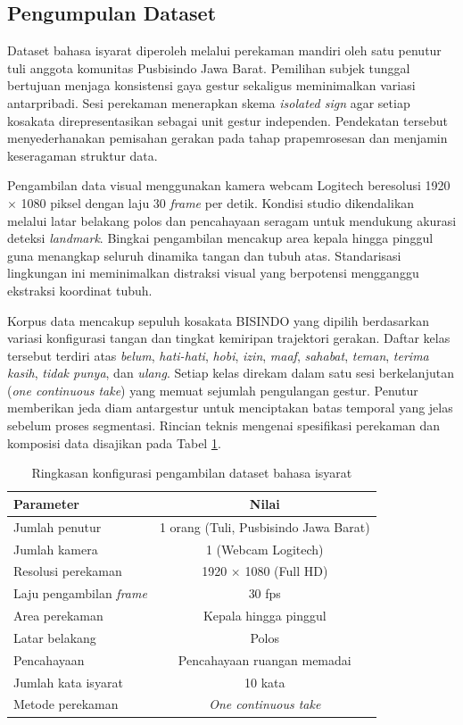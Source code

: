 \subsection{Pengumpulan Dataset}
\label{subsec:pengumpulan-dataset}
Dataset bahasa isyarat diperoleh melalui perekaman mandiri oleh satu penutur tuli anggota komunitas Pusbisindo Jawa Barat. 
Pemilihan subjek tunggal bertujuan menjaga konsistensi gaya gestur sekaligus meminimalkan variasi antarpribadi. 
Sesi perekaman menerapkan skema \textit{isolated sign} agar setiap kosakata direpresentasikan sebagai unit gestur independen. 
Pendekatan tersebut menyederhanakan pemisahan gerakan pada tahap prapemrosesan dan menjamin keseragaman struktur data.

Pengambilan data visual menggunakan kamera webcam Logitech beresolusi 1920 $\times$ 1080 piksel dengan laju 30 \textit{frame} per detik. 
Kondisi studio dikendalikan melalui latar belakang polos dan pencahayaan seragam untuk mendukung akurasi deteksi \textit{landmark}. 
Bingkai pengambilan mencakup area kepala hingga pinggul guna menangkap seluruh dinamika tangan dan tubuh atas. 
Standarisasi lingkungan ini meminimalkan distraksi visual yang berpotensi mengganggu ekstraksi koordinat tubuh.

Korpus data mencakup sepuluh kosakata BISINDO yang dipilih berdasarkan variasi konfigurasi tangan dan tingkat kemiripan trajektori gerakan. 
Daftar kelas tersebut terdiri atas \textit{belum}, \textit{hati-hati}, \textit{hobi}, \textit{izin}, \textit{maaf}, \textit{sahabat}, \textit{teman}, \textit{terima kasih}, \textit{tidak punya}, dan \textit{ulang}. 
Setiap kelas direkam dalam satu sesi berkelanjutan (\textit{one continuous take}) yang memuat sejumlah pengulangan gestur. 
Penutur memberikan jeda diam antargestur untuk menciptakan batas temporal yang jelas sebelum proses segmentasi.
Rincian teknis mengenai spesifikasi perekaman dan komposisi data disajikan pada Tabel \ref{tab:3-dataset-config}.

\begin{table}[H]
	\centering
	\caption{Ringkasan konfigurasi pengambilan dataset bahasa isyarat}
	\label{tab:3-dataset-config}
	\begin{tabular}{|l|c|}
	\hline
	\textbf{Parameter} & \textbf{Nilai} \\ \hline
	Jumlah penutur & 1 orang (Tuli, Pusbisindo Jawa Barat) \\ \hline
	Jumlah kamera & 1 (Webcam Logitech) \\ \hline
	Resolusi perekaman & 1920 $\times$ 1080 (Full HD) \\ \hline
	Laju pengambilan \textit{frame} & 30 fps \\ \hline
	Area perekaman & Kepala hingga pinggul \\ \hline
	Latar belakang & Polos \\ \hline
	Pencahayaan & Pencahayaan ruangan memadai \\ \hline
	Jumlah kata isyarat & 10 kata \\ \hline
	Metode perekaman & \textit{One continuous take} \\ \hline
	\end{tabular}
\end{table}

